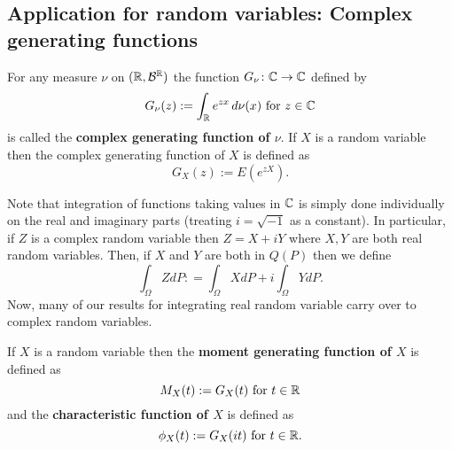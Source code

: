 \clearpage




\begin{shaded}
\subsection{Application for random variables: Complex generating functions}







\begin{definition}
For any measure $\nu$ on $(\Bbb R,\mathcal B^{\Bbb R})$ the function $G_\nu\colon \Bbb C \rightarrow \Bbb C$ defined by
\[G_\nu(z):= \int_{\Bbb R} e^{zx}\,d\nu(x)\text{ for $z\in\Bbb C$}  \]
is called the {\bf complex generating function of $\nu$}. If $X$ is a random variable then the complex generating function of $X$ is defined as
\[
G_{X}(z):= E(e^{zX}).
\]
\end{definition}


Note that integration of functions taking values in $\Bbb C$ is simply done individually on the real and imaginary parts (treating $i=\sqrt{-1}$ as a constant). In particular, if $Z$ is a complex random variable then $Z= X+iY$ where $X,Y$ are both real random variables. Then, if $X$ and $Y$ are both in $Q(P)$ then we define
\[
\int_\Omega ZdP: = \int_\Omega XdP + i\int_\Omega YdP.
\]
Now, many of our results for integrating real random variable carry over to complex random variables.

\begin{definition}
If $X$ is a random variable then the {\bf moment generating function of $X$} is defined as
\[
M_X(t):= G_X(t)\text{  for $t\in \Bbb R$}
\]
and the {\bf characteristic function of $X$} is defined as
\[
\phi_X(t):= G_X(it)\text{  for $t\in \Bbb R$.}
\]
\end{definition}





\end{shaded}
